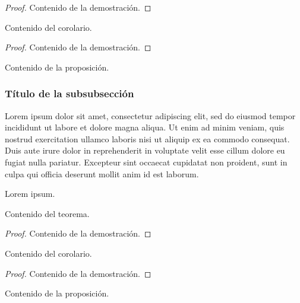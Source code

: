 \begin{proof}
    Contenido de la demostración.
\end{proof}

\begin{corolario}
    Contenido del corolario.
\end{corolario}

\begin{proof}
    Contenido de la demostración.
\end{proof}

\begin{proposicion}
    Contenido de la proposición.
\end{proposicion}

\subsubsection*{Título de la subsubsección}

Lorem ipsum dolor sit amet, consectetur adipiscing elit, sed do eiusmod tempor incididunt ut labore et dolore magna aliqua. Ut enim ad minim veniam, quis nostrud exercitation ullamco laboris nisi ut aliquip ex ea commodo consequat. Duis aute irure dolor in reprehenderit in voluptate velit esse cillum dolore eu fugiat nulla pariatur. Excepteur sint occaecat cupidatat non proident, sunt in culpa qui officia deserunt mollit anim id est laborum.

Lorem ipsum.

\begin{teorema}
    Contenido del teorema.
\end{teorema}

\begin{proof}
    Contenido de la demostración.
\end{proof}

\begin{corolario}
    Contenido del corolario.
\end{corolario}

\begin{proof}
    Contenido de la demostración.
\end{proof}

\begin{proposicion}
    Contenido de la proposición.
\end{proposicion}